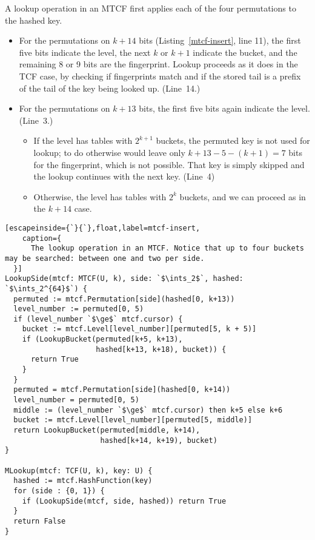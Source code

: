 \documentclass[sigconf, nonacm]{acmart}
\newcommand{\ints}{\mathbb{Z}}
\begin{document}
A lookup operation in an MTCF first applies each of the four permutations to the hashed key.
\begin{itemize}
\item For the permutations on $k + 14$ bits (Listing~\ref{mtcf-insert}, line 11), the first five bits indicate the level, the next $k$ or $k+1$ indicate the bucket, and the remaining 8 or 9 bits are the fingerprint.
Lookup proceeds as it does in the TCF case, by checking if fingerprints match and if the stored tail is a prefix of the tail of the key being looked up. (Line~14.)
\item For the permutations on $k + 13$ bits, the first five bits again indicate the level. (Line~3.)
\begin{itemize}
\item If the level has tables with $2^{k+1}$ buckets, the permuted key is not used for lookup; to do otherwise would leave only $k+13 - 5 - (k+1) = 7$ bits for the fingerprint, which is not possible.
That key is simply skipped and the lookup continues with the next key. (Line~4)
\item Otherwise, the level has tables with $2^k$ buckets, and we can proceed as in the $k+14$ case.
\end{itemize}
\end{itemize}

\begin{lstlisting}[escapeinside={`}{`},float,label=mtcf-insert,
    caption={
      The lookup operation in an MTCF. Notice that up to four buckets may be searched: between one and two per side.
  }]
LookupSide(mtcf: MTCF(U, k), side: `$\ints_2$`, hashed: `$\ints_2^{64}$`) {
  permuted := mtcf.Permutation[side](hashed[0, k+13))
  level_number := permuted[0, 5)
  if (level_number `$\ge$` mtcf.cursor) {
    bucket := mtcf.Level[level_number][permuted[5, k + 5)]
    if (LookupBucket(permuted[k+5, k+13),
                     hashed[k+13, k+18), bucket)) {
      return True
    }
  }
  permuted = mtcf.Permutation[side](hashed[0, k+14))
  level_number = permuted[0, 5)
  middle := (level_number `$\ge$` mtcf.cursor) then k+5 else k+6
  bucket := mtcf.Level[level_number][permuted[5, middle)]
  return LookupBucket(permuted[middle, k+14),
                      hashed[k+14, k+19), bucket)
}

MLookup(mtcf: TCF(U, k), key: U) {
  hashed := mtcf.HashFunction(key)
  for (side : {0, 1}) {
    if (LookupSide(mtcf, side, hashed)) return True
  }
  return False
}
\end{lstlisting}
\end{document}
